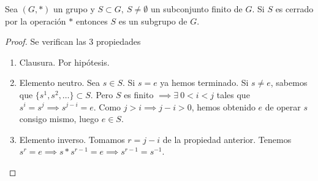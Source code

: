 \documentclass{book}
\theoremstyle{definition}
\newtheorem{ej}{Ejemplo}
\theoremstyle{remark}
\newcommand{\uds}[1]{\mathcal{U}(#1)}
\newcommand{\Z}{\mathbb{Z}}
\begin{document}
\begin{thm}
	\label{thm:subconjuntocerrado}
	Sea $(G, \ast)$ un grupo y $S \subset G,\ S \neq \emptyset$ un subconjunto finito de $G$. Si $S$ es cerrado por la operación $\ast$ entonces $S$ es un subgrupo de $G$.
\end{thm}

\begin{proof}
	Se verifican las 3 propiedades
	\begin{enumerate}
		\item Clausura. Por hipótesis.
		\item Elemento neutro. Sea $s \in S$. Si $s = e$ ya hemos terminado. Si $s \neq e$, sabemos que $\{s^1, s^2, \dots\} \subset S$. Pero $S$ es finito $\implies \exists\ 0 < i < j$ tales que $s^i = s^j \implies s^{j - i} = e$. Como $j > i \implies j - i > 0$, hemos obtenido $e$ de operar $s$ consigo mismo, luego $e \in S$.
		\item Elemento inverso. Tomamos $r = j - i$ de la propiedad anterior. Tenemos $s^r = e \implies s \ast s^{r-1} = e \implies s^{r-1} = s^{-1}$.
	\end{enumerate}
\end{proof}


	
\end{document}
